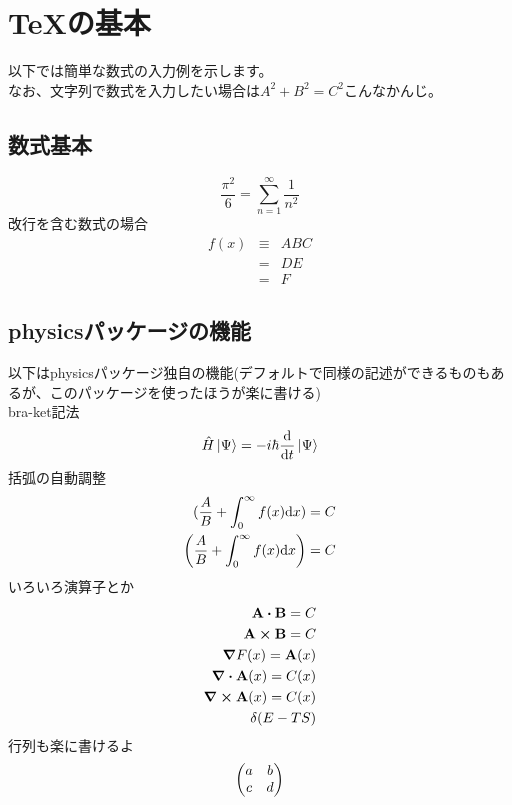 \documentclass[11pt]{report}
\begin{document}
\chapter{TeXの基本}
以下では簡単な数式の入力例を示します。\\
なお、文字列で数式を入力したい場合は$A^2+B^2=C^2$こんなかんじ。
\section{数式基本}
\begin{equation}
\frac{\pi^2}{6}=\sum_{n=1}^{\infty}\frac{1}{n^2}
\end{equation}
改行を含む数式の場合
\begin{eqnarray}
f(x)&\equiv&ABC\\
&=&DE\\
&=&F
\end{eqnarray}
\section{physicsパッケージの機能}
以下はphysicsパッケージ独自の機能(デフォルトで同様の記述ができるものもあるが、このパッケージを使ったほうが楽に書ける)\\
bra-ket記法
\begin{equation}
\hat{H}\ket{\Psi}=-i\hbar\dv{t}\ket{\Psi}
\end{equation}
括弧の自動調整
\begin{eqnarray}
(\frac{A}{B}+\int_0^\infty f(x) \dd x)=C\\
\qty(\frac{A}{B}+\int_0^\infty f(x) \dd x)=C
\end{eqnarray}
いろいろ演算子とか
\begin{eqnarray}
\vb{A}\vdot\vb{B}=C\\
\vb{A}\cross\vb{B}=C\\
\grad{F(x)}=\vb{A}(x)\\
\div{\vb{A}}(x)=C(x)\\
\curl{\vb{A}}(x)=C(x)\\
\var(E-TS)
\end{eqnarray}
行列も楽に書けるよ
\begin{equation}
\mqty(a & b \\ c & d)
\end{equation}
\end{document}

